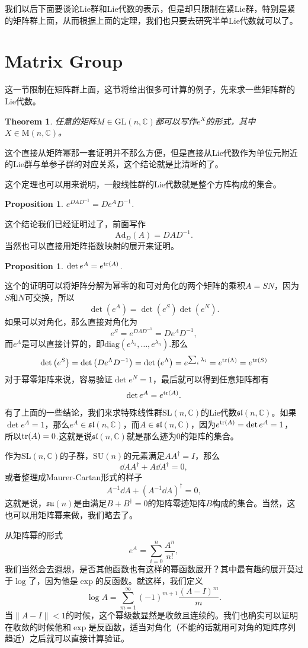\documentclass[9pt]{extbook}
\theoremstyle{plain}
\newtheorem{pro}[defi]{Proposition}
\newtheorem{theo}[defi]{Theorem}
\newcommand{\cc}{\mathbb{C}}
\begin{document}
我们以后下面要谈论Lie群和Lie代数的表示，但是却只限制在紧Lie群，特别是紧的矩阵群上面，从而根据上面的定理，我们也只要去研究半单Lie代数就可以了。

\section{Matrix Group}
这一节限制在矩阵群上面，这节将给出很多可计算的例子，先来求一些矩阵群的Lie代数。
\begin{theo}
任意的矩阵$M\in\mathrm{GL}(n,\cc)$都可以写作$e^X$的形式，其中$X\in\mathrm{M}(n,\cc)$。
\end{theo}
这个直接从矩阵幂那一套证明并不那么方便，但是直接从Lie代数作为单位元附近的Lie群与单参子群的对应关系，这个结论就是比清晰的了。

这个定理也可以用来说明，一般线性群的Lie代数就是整个方阵构成的集合。
\begin{pro}
	$e^{DAD^{-1}}=De^{A}D^{-1}$.
\end{pro}
这个结论我们已经证明过了，前面写作
\[
	\mathrm{Ad}_D(A)=DAD^{-1}.
\]
当然也可以直接用矩阵指数映射的展开来证明。
\begin{pro}
$\det e^A=e^{\operatorname{tr}(A)}$.
\end{pro}
这个的证明可以将矩阵分解为幂零的和可对角化的两个矩阵的乘积$A=SN$，因为$S$和$N$可交换，所以
\[
	\det \left(e^A\right)=\det\left(e^S\right)\det\left(e^N\right).
\]
如果可以对角化，那么直接对角化为
\[
	e^{S}=e^{D\Lambda D^{-1}}=De^{\Lambda} D^{-1},
\]
而$e^{\Lambda}$是可以直接计算的，即$\mathrm{diag}\left(e^{\lambda_1},\dots,e^{\lambda_n}\right)$.那么
\[
	\det \left(e^{S}\right)=\det \left(De^{\Lambda} D^{-1}\right)=\det \left(e^{\Lambda}\right)=e^{\sum_i \lambda_i}=e^{\operatorname{tr}(\Lambda)}=e^{\operatorname{tr}(S)}
\]
对于幂零矩阵来说，容易验证$\det e^N=1$，最后就可以得到任意矩阵都有
\[
	\det e^A=e^{\operatorname{tr}(A)}.
\]

有了上面的一些结论，我们来求特殊线性群$\mathrm{SL}(n,\cc)$的Lie代数$\mathfrak{sl}(n,\cc)$。如果$\det e^A=1$，那么$e^A\in \mathfrak{sl}(n,\cc)$，而$A \in \mathfrak{sl}(n,\cc)$，因为$e^{\operatorname{tr}(A)}=\det e^A=1$，
所以$\operatorname{tr}(A)=0$.这就是说$\mathfrak{sl}(n,\cc)$就是那么迹为0的矩阵的集合。

作为$\mathrm{SL}(n,\cc)$的子群，$\mathrm{SU}(n)$的元素满足$AA^\dag=I$，那么
\[
	\dd A A^\dag+A\dd A^\dag=0,
\]
或者整理成Maurer-Cartan形式的样子
\[
	A^{-1}\dd A +(A^{-1}\dd A)^\dag=0,
\]
这就是说，$\mathfrak{su}(n)$是由满足$B+B^\dag=0$的矩阵零迹矩阵$B$构成的集合。当然，这也可以用矩阵幂来做，我们略去了。

从矩阵幂的形式
\[
	e^A=\sum_{i=0}^n\frac{A^n}{n!},
\]
我们当然会去遐想，是否其他函数也有这样的幂函数展开？其中最有趣的展开莫过于$\log$了，因为他是$\exp$的反函数。就这样，我们定义
\[
	\log A=\sum_{m=1}^\infty (-1)^{m+1}\frac{(A-I)^m}{m}.
\]
当$\|A-I\|<1$的时候，这个幂级数显然是收敛且连续的。我们也确实可以证明在收敛的时候他和$\exp$是反函数，适当对角化（不能的话就用可对角的矩阵序列趋近）之后就可以直接计算验证。
\end{document}
